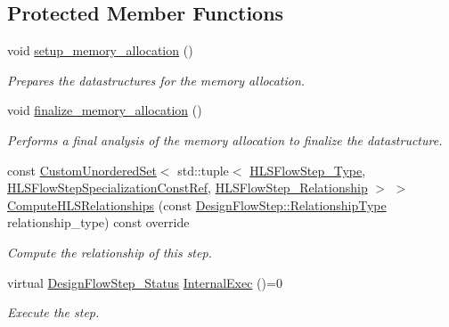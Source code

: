 \subsection*{Protected Member Functions}
\begin{DoxyCompactItemize}
\item 
void \hyperlink{classmemory__allocation_a6710be700bffc38ad1a65f2b24f7b863}{setup\+\_\+memory\+\_\+allocation} ()
\begin{DoxyCompactList}\small\item\em Prepares the datastructures for the memory allocation. \end{DoxyCompactList}\item 
void \hyperlink{classmemory__allocation_aef8d4eaba4caed7aaf19384e67efa6f5}{finalize\+\_\+memory\+\_\+allocation} ()
\begin{DoxyCompactList}\small\item\em Performs a final analysis of the memory allocation to finalize the datastructure. \end{DoxyCompactList}\item 
const \hyperlink{classCustomUnorderedSet}{Custom\+Unordered\+Set}$<$ std\+::tuple$<$ \hyperlink{hls__step_8hpp_ada16bc22905016180e26fc7e39537f8d}{H\+L\+S\+Flow\+Step\+\_\+\+Type}, \hyperlink{hls__step_8hpp_a5fdd2edf290c196531d21d68e13f0e74}{H\+L\+S\+Flow\+Step\+Specialization\+Const\+Ref}, \hyperlink{hls__step_8hpp_a3ad360b9b11e6bf0683d5562a0ceb169}{H\+L\+S\+Flow\+Step\+\_\+\+Relationship} $>$ $>$ \hyperlink{classmemory__allocation_a5c9d84d593aeca03b90d1fc14244bdc9}{Compute\+H\+L\+S\+Relationships} (const \hyperlink{classDesignFlowStep_a723a3baf19ff2ceb77bc13e099d0b1b7}{Design\+Flow\+Step\+::\+Relationship\+Type} relationship\+\_\+type) const override
\begin{DoxyCompactList}\small\item\em Compute the relationship of this step. \end{DoxyCompactList}\item 
virtual \hyperlink{design__flow__step_8hpp_afb1f0d73069c26076b8d31dbc8ebecdf}{Design\+Flow\+Step\+\_\+\+Status} \hyperlink{classmemory__allocation_a7d2e79df1dbef9bc6682ca310eb408d5}{Internal\+Exec} ()=0
\begin{DoxyCompactList}\small\item\em Execute the step. \end{DoxyCompactList}\end{DoxyCompactItemize}
